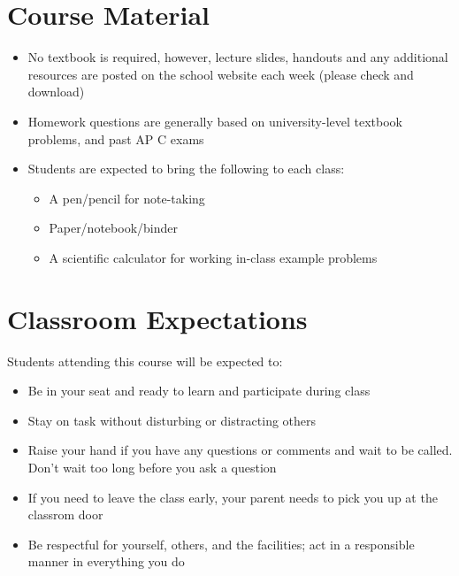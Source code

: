 \documentclass{../../oss-handout}
\begin{document}
\section*{Course Material}
\begin{itemize}[topsep=0pt,noitemsep,leftmargin=18pt]
\item No textbook is required, however, lecture slides, handouts and any
  additional resources are posted on the school website each week (please check
  and download)
\item Homework questions are generally based on university-level textbook
  problems, and past AP C exams
\item Students are expected to bring the following to each class:
  \begin{itemize}[noitemsep,topsep=0pt]
  \item A pen/pencil for note-taking
  \item Paper/notebook/binder
  \item A scientific calculator for working in-class example problems
  \end{itemize}
\end{itemize}


\section*{Classroom Expectations}
Students attending this course will be expected to:
\begin{itemize}[noitemsep,topsep=0pt,leftmargin=18pt]
\item Be in your seat and ready to learn and participate during class
\item Stay on task without disturbing or distracting others
\item Raise your hand if you have any questions or comments and wait to be
  called. Don't wait too long before you ask a question
\item If you need to leave the class early, your parent needs to pick you up at
  the classrom door
\item Be respectful for yourself, others, and the facilities; act in a
  responsible manner in everything you do
\end{itemize}
\end{document}
